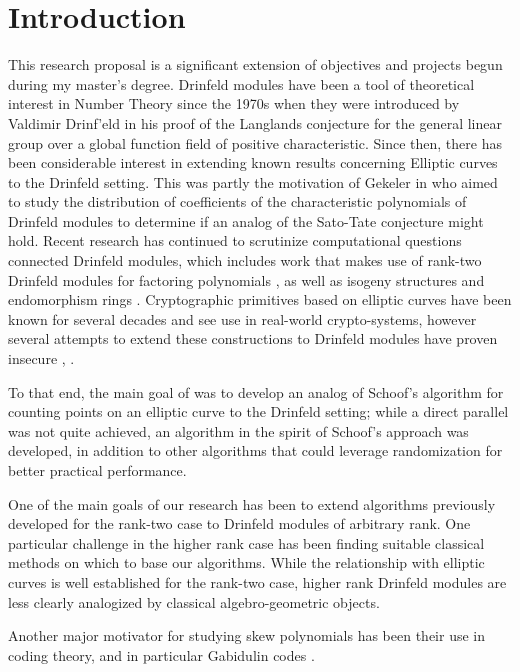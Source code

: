
\chapter{Introduction} \label{ch-1}

This research proposal is a significant extension of objectives and projects begun during my master's degree. Drinfeld modules have been a tool of theoretical interest in Number Theory since the 1970s when they were introduced by Valdimir Drinf'eld in his proof of the Langlands conjecture for the general linear group over a global function field of positive characteristic. Since then, there has been considerable interest in extending known results concerning Elliptic curves to the Drinfeld setting. This was partly the motivation of Gekeler in \cite{frobdist} who aimed to study the distribution of coefficients of the characteristic polynomials of Drinfeld modules to determine if an analog of the Sato-Tate conjecture might hold. Recent research has continued to scrutinize computational questions connected Drinfeld modules, which includes work that makes use of rank-two Drinfeld modules for factoring polynomials \cite{eschost2017arXiv171200669D}, as well as isogeny structures \cite{DBLP:books/ams/20/CaranayGS20} and endomorphism rings \cite{GaPa18}. Cryptographic primitives based on elliptic curves have been known for several decades and see use in real-world crypto-systems, however several attempts to extend these constructions to Drinfeld modules have proven insecure \cite{Scanlon2001PublicKC}, \cite{cryptoeprint:2019:1329}. 

To that end, the main goal of \cite{Musleh} was to develop an analog of Schoof's algorithm for counting points on an elliptic curve to the Drinfeld setting; while a direct parallel was not quite achieved, an algorithm in the spirit of Schoof's approach was developed, in addition to other algorithms that could leverage randomization for better practical performance. 

One of the main goals of our research has been to extend algorithms previously developed for the rank-two case to Drinfeld modules of arbitrary rank. One particular challenge in the higher rank case has been finding suitable classical methods on which to base our algorithms. While the relationship with elliptic curves is well established for the rank-two case, higher rank Drinfeld modules are less clearly analogized by classical algebro-geometric objects. 

Another major motivator for studying skew polynomials has been their use in coding theory, and in particular Gabidulin codes \cite{PUCHINGER2017b} \cite{bartz2021fast}. 




